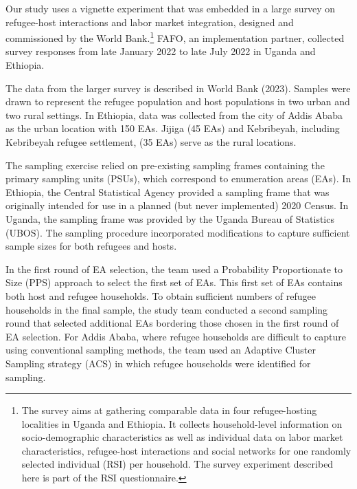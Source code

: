 \documentclass[a4paper,12pt]{article}
\begin{document}
\begin{appendix}
Our study uses a vignette experiment that was embedded in a large survey on refugee-host interactions and labor market integration, designed and commissioned by the World Bank.\footnote{The survey aims at gathering comparable data in four refugee-hosting localities in Uganda and Ethiopia. It collects household-level information on socio-demographic characteristics as well as individual data on labor market characteristics, refugee-host interactions and social networks for one randomly selected individual (RSI) per household. The survey experiment described here is part of the RSI questionnaire.} FAFO, an implementation partner, collected survey responses from late January 2022 to late July 2022 in Uganda and Ethiopia. 
 
The data from the larger survey is described in World Bank (2023). Samples were drawn to represent the refugee population and host populations in two urban and two rural settings. In Ethiopia, data was collected from the city of Addis Ababa as the urban location with 150 EAs. Jijiga (45 EAs) and Kebribeyah, including Kebribeyah refugee settlement, (35 EAs) serve as the rural locations. 
 
The sampling exercise relied on pre-existing sampling frames containing the primary sampling units (PSUs), which correspond to enumeration areas (EAs). In Ethiopia, the Central Statistical Agency provided a sampling frame that was originally intended for use in a planned (but never implemented) 2020 Census. In Uganda, the sampling frame was provided by the Uganda Bureau of Statistics (UBOS). The sampling procedure incorporated modifications to capture sufficient sample sizes for both refugees and hosts. 
 
In the first round of EA selection, the team used a Probability Proportionate to Size (PPS) approach to select the first set of EAs. This first set of EAs contains both host and refugee households. To obtain sufficient numbers of refugee households in the final sample, the study team conducted a second sampling round that selected additional EAs bordering those chosen in the first round of EA selection. For Addis Ababa, where refugee households are difficult to capture using conventional sampling methods, the team used an Adaptive Cluster Sampling strategy (ACS) in which refugee households were identified for sampling.  
    

\end{appendix}
\end{document}

